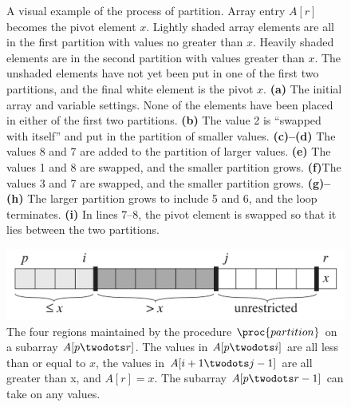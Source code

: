 \documentclass[12pt]{article}
\begin{document}
\begin{figure}[!ht]
\caption{
    A visual example of the process of partition. Array entry $A[r]$ becomes the pivot element $x$. Lightly shaded array elements are all in the first partition with values no greater than $x$. Heavily shaded elements are in the second partition with values greater than $x$. The unshaded elements have not yet been put in one of the first two partitions, and the final white element is the pivot $x$. 
    \textbf{(a)} The initial array and variable settings. None of the elements have been placed in either of the first two partitions.
    \textbf{(b)} The value 2 is “swapped with itself” and put in the partition of smaller values. 
    \textbf{(c)–(d)} The values 8 and 7 are added to the partition of larger values. 
    \textbf{(e)} The values 1 and 8 are swapped, and the smaller partition grows. 
    \textbf{(f)}The values 3 and 7 are swapped, and the smaller partition grows. 
    \textbf{(g)–(h)} The larger partition grows to include 5 and 6, and the loop terminates. 
    \textbf{(i)} In lines 7–8, the pivot element is swapped so that it lies between the two partitions.
}
\label{fig:quicksort1}
\end{figure}

\clearpage

\begin{figure}[!ht]
\includegraphics[scale=0.25]{partitions}
\caption{
    The four regions maintained by the procedure $\proc{partition}$ on a subarray $A[p \twodots r]$. The values in $A[p \twodots i]$ are all less than or equal to $x$, the values in $A[i+1 \twodots j-1]$ are all greater than x, and $A[r] = x$. The subarray $A[p \twodots r-1]$ can take on any values.
}
\label{fig:quicksort2}
\end{figure}
\end{document}
